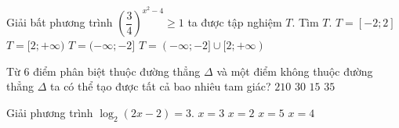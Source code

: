 \begin{ex}%
	Giải bất phương trình $\left(\dfrac{3}{4} \right)^{x^2-4}\geq 1$ ta được tập nghiệm $T$. Tìm $T$.
	\choice
	{\True $T=[-2;2 ]$}
	{$T=[2;+\infty )$}
	{$T=(-\infty;-2]$}
	{$T=(-\infty;-2 ]\cup [2;+\infty)$
	}
\end{ex}
\begin{ex}%
	Từ $ 6 $ điểm phân biệt thuộc đường thẳng $\Delta $ và một điểm không thuộc đường thẳng $\Delta $ ta có thể tạo được tất cả bao nhiêu tam giác? 
	\choice
	{$210$}
	{$30$}
	{\True $15$}
	{$35$}
\end{ex}
\begin{ex}%
	Giải phương trình $\log _2(2x - 2) = 3$.
	\choice
	{$x = 3$}
	{$x = 2$}
	{\True $x = 5$}
	{$x = 4$}
\end{ex}
